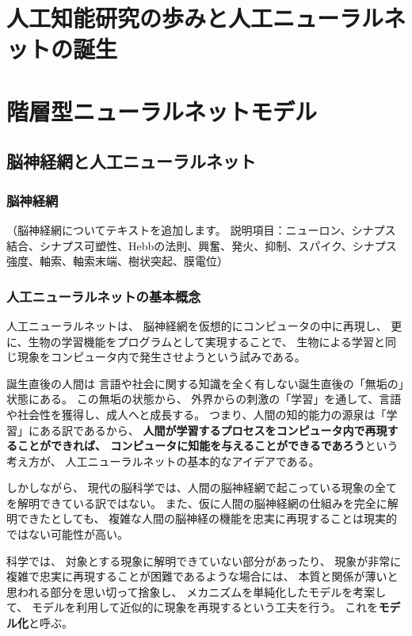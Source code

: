 
\section{人工知能研究の歩みと人工ニューラルネットの誕生}
\label{sec:history}

\section{階層型ニューラルネットモデル}
\label{sec:hierarchical}

\subsection{脳神経網と人工ニューラルネット}
\label{sec:BNN-ANN}

\subsubsection{脳神経網}
\label{sec:neural-networks}

（脳神経網についてテキストを追加します。
説明項目：ニューロン、シナプス結合、シナプス可塑性、Hebbの法則、興奮、発火、抑制、スパイク、シナプス強度、軸索、軸索末端、樹状突起、膜電位）

\subsubsection{人工ニューラルネットの基本概念}
\label{sec:ann}


人工ニューラルネットは、
脳神経網を仮想的にコンピュータの中に再現し、
更に、生物の学習機能をプログラムとして実現することで、
生物による学習と同じ現象をコンピュータ内で発生させようという試みである。

誕生直後の人間は
言語や社会に関する知識を全く有しない誕生直後の「無垢の」状態にある。
この無垢の状態から、
外界からの刺激の「学習」を通して、言語や社会性を獲得し、成人へと成長する。
つまり、人間の知的能力の源泉は「学習」にある訳であるから、
\textbf{人間が学習するプロセスをコンピュータ内で再現することができれば、
コンピュータに知能を与えることができるであろう}という考え方が、
人工ニューラルネットの基本的なアイデアである。

しかしながら、
現代の脳科学では、人間の脳神経網で起こっている現象の全てを解明できている訳ではない。
また、仮に人間の脳神経網の仕組みを完全に解明できたとしても、
複雑な人間の脳神経の機能を忠実に再現することは現実的ではない可能性が高い。

科学では、
対象とする現象に解明できていない部分があったり、
現象が非常に複雑で忠実に再現することが困難であるような場合には、
本質と関係が薄いと思われる部分を思い切って捨象し、
メカニズムを単純化したモデルを考案して、
モデルを利用して近似的に現象を再現するという工夫を行う。
これを\textbf{モデル化}と呼ぶ。

